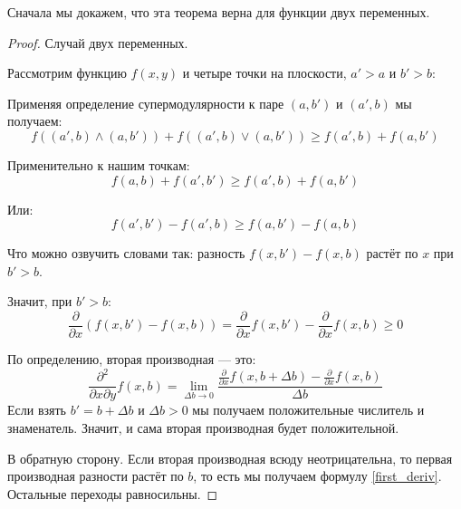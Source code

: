 Сначала мы докажем, что эта теорема верна для функции двух переменных.
\begin{proof} Случай двух переменных.

Рассмотрим функцию $ f(x,y) $ и четыре точки на плоскости, $ a'>a $ и $ b'>b $:



Применяя определение супермодулярности к паре $ (a,b') $ и $ (a',b) $ мы получаем:
\begin{equation}
f((a',b)\wedge(a,b')) + f((a',b)\vee(a,b'))\geq f(a',b) + f(a,b')
\end{equation}

Применительно к нашим точкам:
\begin{equation}
f(a,b)+f(a',b')\geq f(a',b)+f(a,b')
\end{equation}

Или:
\begin{equation}
f(a',b')-f(a',b)\geq f(a,b')-f(a,b)
\end{equation}

Что можно озвучить словами так: разность $ f(x,b')-f(x,b) $ растёт по $ x $ при $ b'>b $.


Значит, при $ b'>b $:
\begin{equation}\label{first_deriv}
\frac{\partial }{\partial x}(f(x,b')-f(x,b))=\frac{\partial }{\partial x}f(x,b')-\frac{\partial }{\partial x} f(x,b) \geq 0
\end{equation}

По определению, вторая производная — это:
\begin{equation}
\frac{\partial^{2}}{\partial x \partial y}f(x,b)=\lim_{\Delta b\to 0}\frac{\frac{\partial }{\partial x}f(x,b+\Delta b)-\frac{\partial }{\partial x} f(x,b)}{\Delta b}
\end{equation}
Если взять $ b'=b+\Delta b $ и $ \Delta b>0 $ мы получаем положительные числитель и знаменатель. Значит, и сама вторая производная будет положительной.

В обратную сторону. Если вторая производная всюду неотрицательна, то первая производная разности растёт по $ b $, то есть мы получаем формулу \ref{first_deriv}. Остальные переходы равносильны.

\end{proof}


